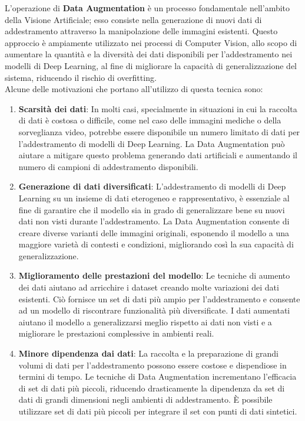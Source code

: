 \documentclass[12pt,a4paper,openright,twoside]{book}
\begin{document}
L'operazione di \textbf{Data Augmentation} è un processo fondamentale nell'ambito della Visione Artificiale; esso consiste nella generazione di nuovi dati di addestramento attraverso la manipolazione delle immagini esistenti. Questo approccio è ampiamente utilizzato nei processi di Computer Vision, allo scopo di aumentare la quantità e la diversità dei dati disponibili per l'addestramento nei modelli di Deep Learning, al fine di migliorare la capacità di generalizzazione del sistema, riducendo il rischio di overfitting.\\
Alcune delle motivazioni che portano all'utilizzo di questa tecnica sono:
\begin{enumerate}
\item \textbf{Scarsità dei dati}:
In molti casi, specialmente in situazioni in cui la raccolta di dati è costosa o difficile, come nel caso delle immagini mediche o della sorveglianza video, potrebbe essere disponibile un numero limitato di dati per l'addestramento di modelli di Deep Learning. La Data Augmentation può aiutare a mitigare questo problema generando dati artificiali e aumentando il numero di campioni di addestramento disponibili.

\item \textbf{Generazione di dati diversificati}:
L'addestramento di modelli di Deep Learning su un insieme di dati eterogeneo e rappresentativo, è essenziale al fine di garantire che il modello sia in grado di generalizzare bene su nuovi dati non visti durante l'addestramento. La Data Augmentation consente di creare diverse varianti delle immagini originali, esponendo il modello a una maggiore varietà di contesti e condizioni, migliorando così la sua capacità di generalizzazione.

\item \textbf{Miglioramento delle prestazioni del modello}:
Le tecniche di aumento dei dati aiutano ad arricchire i dataset creando molte variazioni dei dati esistenti. Ciò fornisce un set di dati più ampio per l'addestramento e consente ad un modello di riscontrare funzionalità più diversificate. I dati aumentati aiutano il modello a generalizzarsi meglio rispetto ai dati non visti e a migliorare le prestazioni complessive in ambienti reali. 

\item \textbf{Minore dipendenza dai dati}:
La raccolta e la preparazione di grandi volumi di dati per l'addestramento possono essere costose e dispendiose in termini di tempo. Le tecniche di Data Augmentation incrementano l'efficacia di set di dati più piccoli, riducendo drasticamente la dipendenza da set di dati di grandi dimensioni negli ambienti di addestramento. È possibile utilizzare set di dati più piccoli per integrare il set con punti di dati sintetici.


\end{enumerate}
\end{document}
